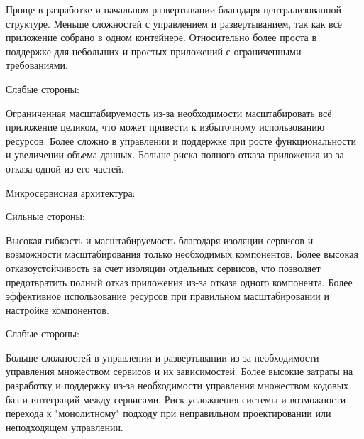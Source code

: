         Проще в разработке и начальном развертывании благодаря централизованной структуре.
        Меньше сложностей с управлением и развертыванием, так как всё приложение собрано в одном контейнере.
        Относительно более проста в поддержке для небольших и простых приложений с ограниченными требованиями.
    
    Слабые стороны:
    
        Ограниченная масштабируемость из-за необходимости масштабировать всё приложение целиком, что может привести к избыточному использованию ресурсов.
        Более сложно в управлении и поддержке при росте функциональности и увеличении объема данных.
        Больше риска полного отказа приложения из-за отказа одной из его частей.
    
    Микросервисная архитектура:
    
    Сильные стороны:
    
        Высокая гибкость и масштабируемость благодаря изоляции сервисов и возможности масштабирования только необходимых компонентов.
        Более высокая отказоустойчивость за счет изоляции отдельных сервисов, что позволяет предотвратить полный отказ приложения из-за отказа одного компонента.
        Более эффективное использование ресурсов при правильном масштабировании и настройке компонентов.
    
    Слабые стороны:
    
        Больше сложностей в управлении и развертывании из-за необходимости управления множеством сервисов и их зависимостей.
        Более высокие затраты на разработку и поддержку из-за необходимости управления множеством кодовых баз и интеграций между сервисами.
        Риск усложнения системы и возможности перехода к "монолитному" подходу при неправильном проектировании или неподходящем управлении.
        
\clearpage
